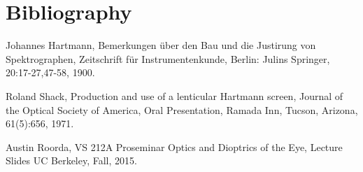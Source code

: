 \documentclass{article}
\begin{document}
\section{Bibliography}
\begin{thebibliography}{9}

  Johannes Hartmann,
  {Bemerkungen über den Bau und die Justirung von Spektrographen},
  Zeitschrift für Instrumentenkunde,
  Berlin: Julins Springer,
  20:17-27,47-58,
  1900.
  
  Roland Shack,
  {Production and use of a lenticular Hartmann screen},
  Journal of the Optical Society of America,
  Oral Presentation,
  Ramada Inn, Tucson, Arizona,
  61(5):656,
  1971.
  
  Austin Roorda,
  {VS 212A Proseminar Optics and Dioptrics of the Eye},
  Lecture Slides  
  UC Berkeley,
  Fall, 2015.

\end{thebibliography}
\end{document}
